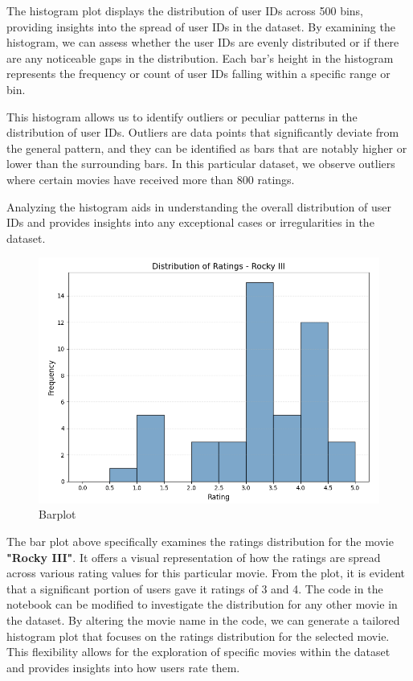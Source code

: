 \documentclass[11pt]{article}
\begin{document}
\vspace{0.3cm}

The histogram plot displays the distribution of user IDs across 500 bins, providing insights into the spread of user IDs in the dataset. By examining the histogram, we can assess whether the user IDs are evenly distributed or if there are any noticeable gaps in the distribution. Each bar's height in the histogram represents the frequency or count of user IDs falling within a specific range or bin.

This histogram allows us to identify outliers or peculiar patterns in the distribution of user IDs. Outliers are data points that significantly deviate from the general pattern, and they can be identified as bars that are notably higher or lower than the surrounding bars. In this particular dataset, we observe outliers where certain movies have received more than 800 ratings.

Analyzing the histogram aids in understanding the overall distribution of user IDs and provides insights into any exceptional cases or irregularities in the dataset.

\begin{figure}[H]
  \centering
  \includegraphics[width=.9\textwidth]{image/barplot.png}
  \caption{Barplot}
\end{figure}

The bar plot above specifically examines the ratings distribution for the movie \textbf{"Rocky III"}. It offers a visual representation of how the ratings are spread across various rating values for this particular movie. From the plot, it is evident that a significant portion of users gave it ratings of 3 and 4. The code in the notebook can be modified to investigate the distribution for any other movie in the dataset. By altering the movie name in the code, we can generate a tailored histogram plot that focuses on the ratings distribution for the selected movie. This flexibility allows for the exploration of specific movies within the dataset and provides insights into how users rate them.
\end{document}

